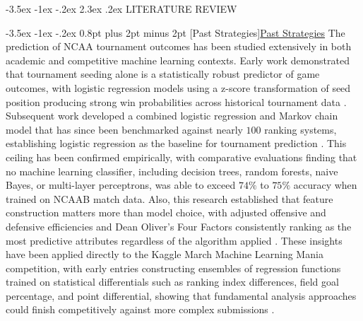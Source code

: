 \documentclass[12pt,leqno]{article}\usepackage[pdftex]{graphicx}\usepackage[dvipsnames]{xcolor}
\makeatletter
\renewcommand\section{\@startsection {section}{1}{\z@}%
{-3.5ex \@plus -1ex \@minus -.2ex}%
{2.3ex \@plus.2ex}%
{\normalfont\centering}}
\renewcommand\subsection{\@startsection {subsection}{1}{\z@}%
{-3.5ex \@plus -1ex \@minus -.2ex}%
{0.8pt plus 2pt minus 2pt}%
{\normalfont}}
\newcommand{\usubsection}[1]{\subsection[#1]{\centering\normalfont\underline{#1}}}%
\theoremstyle{remark}
\makeatother
\begin{document}




\begin{center}
\section{LITERATURE REVIEW}
\end{center}
\thispagestyle{empty} %


\usubsection{Past Strategies}
The prediction of NCAA tournament outcomes has been studied extensively in both academic and competitive machine learning contexts. Early work demonstrated that tournament seeding alone is a statistically robust predictor of game outcomes, with logistic regression models using a z-score transformation of seed position producing strong win probabilities across historical tournament data \cite{Schwertman}. Subsequent work developed a combined logistic regression and Markov chain model that has since been benchmarked against nearly $100$ ranking systems, establishing logistic regression as the baseline for tournament prediction \cite{Sokol2026}. This ceiling has been confirmed empirically, with comparative evaluations finding that no machine learning classifier, including decision trees, random forests, naive Bayes, or multi-layer perceptrons, was able to exceed $74\%$ to $75\%$ accuracy when trained on NCAAB match data. Also, this research established that feature construction matters more than model choice, with adjusted offensive and defensive efficiencies and Dean Oliver's Four Factors consistently ranking as the most predictive attributes regardless of the algorithm applied \cite{Zimmermann}. These insights have been applied directly to the Kaggle March Machine Learning Mania competition, with early entries constructing ensembles of regression functions trained on statistical differentials such as ranking index differences, field goal percentage, and point differential, showing that fundamental analysis approaches could finish competitively against more complex submissions \cite{Gumm}.
\end{document}
